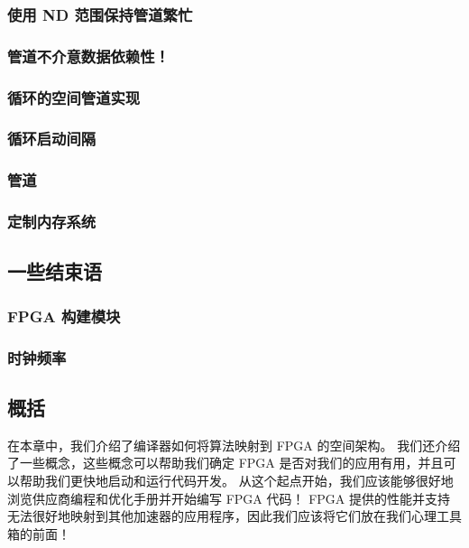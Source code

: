\subsubsection{使用 ND 范围保持管道繁忙}

\subsubsection{管道不介意数据依赖性！}

\subsubsection{循环的空间管道实现}

\subsubsection{循环启动间隔}

\subsubsection{管道}

\subsubsection{定制内存系统}

\subsection{一些结束语}

\subsubsection{FPGA 构建模块}

\subsubsection{时钟频率}

\subsection{概括}
在本章中，我们介绍了编译器如何将算法映射到 FPGA 的空间架构。 我们还介绍了一些概念，这些概念可以帮助我们确定 FPGA 是否对我们的应用有用，并且可以帮助我们更快地启动和运行代码开发。 从这个起点开始，我们应该能够很好地浏览供应商编程和优化手册并开始编写 FPGA 代码！ FPGA 提供的性能并支持无法很好地映射到其他加速器的应用程序，因此我们应该将它们放在我们心理工具箱的前面！